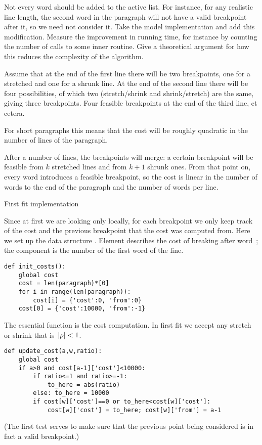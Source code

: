 \begin{594exercise}
Not every word should be added to the active list. For instance, for
any realistic line length, the second word in the paragraph will not
have a valid breakpoint after it, so we need not consider it.  Take
the model implementation and add this modification. Measure the
improvement in running time, for instance by counting the number of
calls to some inner routine.  Give a theoretical argument for how this
reduces the complexity of the algorithm.
\end{594exercise}
\begin{answer}
Assume that at the end of the first line there will be two
breakpoints, one for a stretched and one for a shrunk line. At the end
of the second line there will be four possibilities, of which two
(stretch/shrink and shrink/stretch) are the same, giving three
breakpoints. Four feasible breakpoints at the end of the third line,
et cetera.

For short paragraphs this means that the cost will be roughly
quadratic in the number of lines of the paragraph.

After a number of lines, the breakpoints will merge: a certain breakpoint
will be feasible from $k$ stretched lines and from $k+1$ shrunk
ones. From that point on, every word introduces a feasible breakpoint,
so the cost is linear in the number of words to the end of the
paragraph and the number of words per line.
\end{answer}

 {First fit implementation}

Since at first we are looking only locally, for each breakpoint we
only keep track of the cost and the previous breakpoint that the cost
was computed from.  Here we set up the data structure
. Element  describes the cost of breaking after
word~; the  component is the number of the first word
of the line.
\begin{verbatim}
def init_costs():
    global cost
    cost = len(paragraph)*[0]
    for i in range(len(paragraph)):
        cost[i] = {'cost':0, 'from':0}
    cost[0] = {'cost':10000, 'from':-1}
\end{verbatim}

The essential function is the cost computation. In first fit we accept
any stretch or shrink that is~$|\rho|<\nobreak1$.
\begin{verbatim}
def update_cost(a,w,ratio):
    global cost
    if a>0 and cost[a-1]['cost']<10000:
        if ratio<=1 and ratio>=-1:
            to_here = abs(ratio)
        else: to_here = 10000
        if cost[w]['cost']==0 or to_here<cost[w]['cost']:
            cost[w]['cost'] = to_here; cost[w]['from'] = a-1
\end{verbatim}
(The first test serves to make sure that the previous point being
considered is in fact a valid breakpoint.)

